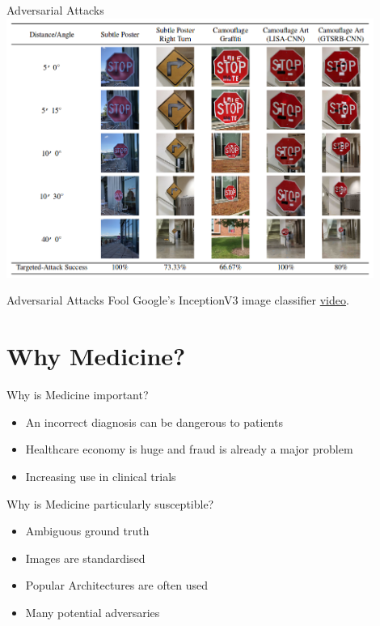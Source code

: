 \documentclass{beamer}
\begin{document}
\begin{frame}{Adversarial Attacks}
\centering
\includegraphics[width=0.9\textwidth]{./images/adverse-road-sign.png}

\cite{Eykholt_Evtimov_Fernandes_Li_Rahmati_Xiao_Prakash_Kohno_Song_2017}
\end{frame}


\begin{frame}{Adversarial Attacks}
Fool Google's InceptionV3 image classifier \href{https://www.youtube.com/watch?v=piYnd_wYlT8}{\alert{video}}.
\cite{Athalye_Engstrom_Ilyas_Kwok_2017, Ilyas_Engstrom_Athalye_Lin_2018}
\end{frame}



\section{Why Medicine?}

\begin{frame}{Why is Medicine important?}
\begin{itemize}
    \item An incorrect diagnosis can be dangerous to patients
    \pause
    \item Healthcare economy is huge and fraud is already a major problem \cite{Jain_Nundy_Abbasi_2014}
    \pause
    \item Increasing use in clinical trials \cite{Pien_Fischman_Thrall_Sorensen_2005}
\end{itemize}
\end{frame}

\begin{frame}{Why is Medicine particularly susceptible?}
\begin{itemize}
    \item Ambiguous ground truth \cite{Njeh_2008}
    \pause
    \item Images are standardised
    \pause
    \item Popular Architectures are often used
    \pause
    \item Many potential adversaries
\end{itemize}

\end{frame}
\end{document}
